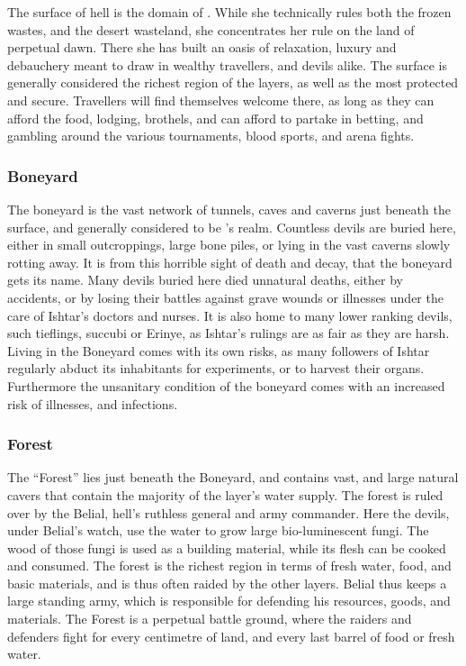 The surface of hell is the domain of . While she
technically rules both the frozen wastes, and the desert wasteland, she
concentrates her rule on the land of perpetual dawn. There she has built an
oasis of relaxation, luxury and debauchery meant to draw in wealthy
travellers, and devils alike. The surface is generally considered the richest
region of the layers, as well as the most protected and secure. Travellers
will find themselves welcome there, as long as they can afford the food,
lodging, brothels, and can afford to partake in betting, and gambling around
the various tournaments, blood sports, and arena fights.

\subsubsection{Boneyard}
\label{sec:Boneyard}

The boneyard is the vast network of tunnels, caves and caverns just beneath
the surface, and generally considered to be 's
realm. Countless devils are buried here, either in small outcroppings, large
bone piles, or lying in the vast caverns slowly rotting away. It is from this
horrible sight of death and decay, that the boneyard gets its name. Many
devils buried here died unnatural deaths, either by accidents, or by losing
their battles against grave wounds or illnesses under the care of Ishtar's
doctors and nurses. It is also home to many lower ranking devils, such
tieflings, succubi or Erinye, as Ishtar's rulings are as fair as they are
harsh. Living in the Boneyard comes with its own risks, as many followers of
Ishtar regularly abduct its inhabitants for experiments, or to harvest their
organs. Furthermore the unsanitary condition of the boneyard comes with an
increased risk of illnesses, and infections.

\subsubsection{Forest}
\label{sec:Forest}

The ``Forest'' lies just beneath the Boneyard, and contains vast, and large
natural cavers that contain the majority of the layer's water supply. The
forest is ruled over by the Belial, hell's ruthless general and army
commander. Here the devils, under Belial's watch, use the water to grow large
bio-luminescent fungi. The wood of those fungi is used as a building material,
while its flesh can be cooked and consumed. The forest is the richest region
in terms of fresh water, food, and basic materials, and is thus often raided
by the other layers. Belial thus keeps a large standing army, which is
responsible for defending his resources, goods, and materials. The Forest is a
perpetual battle ground, where the raiders and defenders fight for every
centimetre of land, and every last barrel of food or fresh water.

